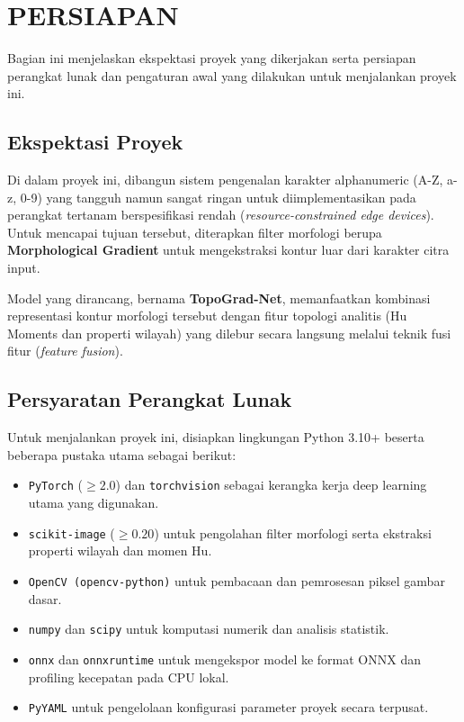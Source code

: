 \documentclass[12pt,a4paper]{article}
\begin{document}
\section*{PERSIAPAN}
Bagian ini menjelaskan ekspektasi proyek yang dikerjakan serta persiapan perangkat lunak dan pengaturan awal yang dilakukan untuk menjalankan proyek ini.

\subsection*{Ekspektasi Proyek}
Di dalam proyek ini, dibangun sistem pengenalan karakter alphanumeric (A-Z, a-z, 0-9) yang tangguh namun sangat ringan untuk diimplementasikan pada perangkat tertanam berspesifikasi rendah (\textit{resource-constrained edge devices}). Untuk mencapai tujuan tersebut, diterapkan filter morfologi berupa \textbf{Morphological Gradient} untuk mengekstraksi kontur luar dari karakter citra input.

Model yang dirancang, bernama \textbf{TopoGrad-Net}, memanfaatkan kombinasi representasi kontur morfologi tersebut dengan fitur topologi analitis (Hu Moments dan properti wilayah) yang dilebur secara langsung melalui teknik fusi fitur (\textit{feature fusion}).

\subsection*{Persyaratan Perangkat Lunak}
Untuk menjalankan proyek ini, disiapkan lingkungan Python 3.10+ beserta beberapa pustaka utama sebagai berikut:
\begin{itemize}
    \item \texttt{PyTorch} ($\ge 2.0$) dan \texttt{torchvision} sebagai kerangka kerja deep learning utama yang digunakan.
    \item \texttt{scikit-image} ($\ge 0.20$) untuk pengolahan filter morfologi serta ekstraksi properti wilayah dan momen Hu.
    \item \texttt{OpenCV (opencv-python)} untuk pembacaan dan pemrosesan piksel gambar dasar.
    \item \texttt{numpy} dan \texttt{scipy} untuk komputasi numerik dan analisis statistik.
    \item \texttt{onnx} dan \texttt{onnxruntime} untuk mengekspor model ke format ONNX dan profiling kecepatan pada CPU lokal.
    \item \texttt{PyYAML} untuk pengelolaan konfigurasi parameter proyek secara terpusat.
\end{itemize}
\end{document}
